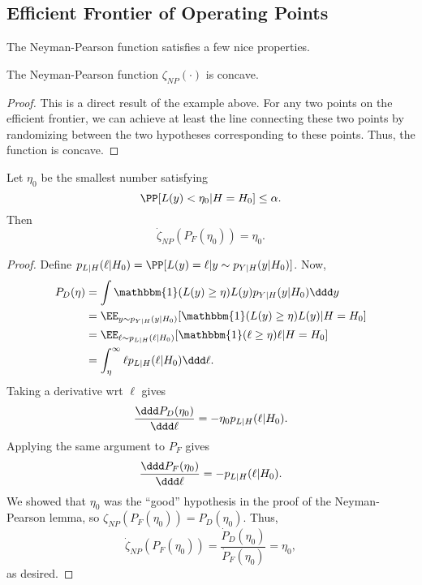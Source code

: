 \subsection{Efficient Frontier of Operating Points}

The Neyman-Pearson function satisfies a few nice properties.

\begin{theorem}
\corlabel

The Neyman-Pearson function $\zeta_{NP}(\cdot)$ is concave.
\end{theorem}

\begin{proof}
This is a direct result of the example above. For any two points on the efficient frontier, we can achieve at least the line connecting these two points by randomizing between the two hypotheses corresponding to these points. Thus, the function is concave. 
\end{proof}

\begin{theorem}
\corlabel

Let $\eta_0$ be the smallest number satisfying 
\[\PP[L(y)<\eta_0|H=H_0]\leq \alpha.\] 
Then 
\[\dot{\zeta}_{NP}(P_F(\eta_0)) = \eta_0.\] 
\end{theorem}

\begin{proof}
Define $p_{L|H}(\ell | H_0) = \PP[L(y) = \ell | y\sim p_{Y|H}(y|H_0)]$. Now, 
\begin{align*}
	P_D(\eta) &= \int \mathbbm{1}(L(y)\geq \eta)L(y)p_{Y|H}(y|H_0)\ddd y \\
						&= \EE_{y\sim p_{Y|H}(y|H_0)}[\mathbbm{1}(L(y)\geq \eta)L(y)|H=H_0] \\
						&= \EE_{\ell\sim p_{L|H}(\ell | H_0)}[\mathbbm{1}(\ell\geq \eta)\ell | H=H_0] \\
						&= \int_{\eta}^{\infty}\ell p_{L|H}(\ell | H_0) \ddd \ell.
\end{align*}
Taking a derivative wrt $\ell$ gives 
\[\frac{\ddd P_D(\eta_0)}{\ddd \ell} = -\eta_0p_{L|H}(\ell | H_0).\] 
Applying the same argument to $P_F$ gives 
\[\frac{\ddd P_F(\eta_0)}{\ddd \ell} = -p_{L|H}(\ell | H_0).\] 
We showed that $\eta_0$ was the ``good'' hypothesis in the proof of the Neyman-Pearson lemma, so $\zeta_{NP}(P_F(\eta_0)) = P_D(\eta_0)$. Thus,
\[\dot{\zeta}_{NP}(P_F(\eta_0)) = \frac{\dot{P}_D(\eta_0)}{\dot{P}_F(\eta_0)} = \eta_0,\] 
as desired.
\end{proof}
